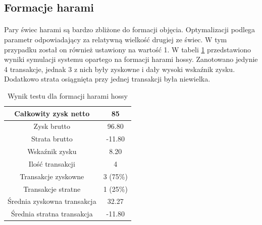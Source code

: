\documentclass[pdflatex,11pt]{aghdpl}
\begin{document}
\subsection{Formacje harami}
\paragraph{}
Pary świec harami są bardzo zbliżone do formacji objęcia. Optymalizacji podlega parametr odpowiadający za relatywną wielkość drugiej ze świec. W tym przypadku został on również ustawiony na wartość 1. W tabeli \ref{raport_harami_hossy} przedstawiono wyniki symulacji systemu opartego na formacji harami hossy. Zanotowano jedynie 4 transakcje, jednak 3 z nich były zyskowne i dały wysoki wskaźnik zysku. Dodatkowo strata osiągnięta przy jednej transakcji była niewielka. 
\begin{table}[h!]
\begin{center}
\begin{tabular}{|c|c|}
\hline 
Całkowity zysk netto & 85\\
\hline
Zysk brutto & 96.80 \\
\hline
Strata brutto & -11.80 \\
\hline
Wskaźnik zysku & 8.20 \\
\hline
\hline
Ilość transakcji & 4 \\
\hline
Transakcje zyskowne & 3 (75\%) \\
\hline
Transakcje stratne & 1 (25\%) \\
\hline
\hline
Średnia zyskowna transakcja & 32.27 \\
\hline
Średnia stratna transakcja & -11.80 \\
\hline
\end{tabular} 
\caption{Wynik testu dla formacji harami hossy}
\label{raport_harami_hossy}
\end{center}
\end{table}
\end{document}
